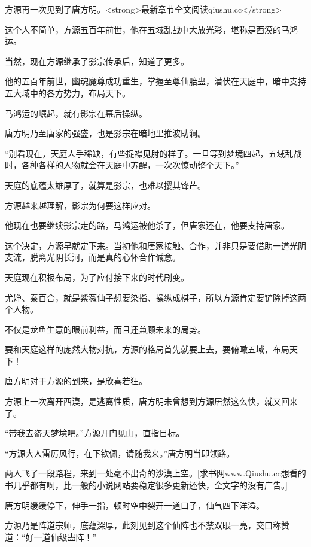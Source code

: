 
\begin{this_body}

方源再一次见到了唐方明。<strong>最新章节全文阅读qiushu.cc</strong>

这个人不简单，方源五百年前世，他在五域乱战中大放光彩，堪称是西漠的马鸿运。

当然，现在方源继承了影宗传承后，知道了更多。

他的五百年前世，幽魂魔尊成功重生，掌握至尊仙胎蛊，潜伏在天庭中，暗中支持五大域中的各方势力，布局天下。

马鸿运的崛起，就有影宗在幕后操纵。

唐方明乃至唐家的强盛，也是影宗在暗地里推波助澜。

“别看现在，天庭人手稀缺，有些捉襟见肘的样子。一旦等到梦境四起，五域乱战时，各种各样的人物就会在天庭中苏醒，一次次惊动整个天下。”

天庭的底蕴太雄厚了，就算是影宗，也难以撄其锋芒。

方源越来越理解，影宗为何要这样应对。

他现在也要继续影宗走的路，马鸿运被他杀了，但唐家还在，他要支持唐家。

这个决定，方源早就定下来。当初他和唐家接触、合作，并非只是要借助一道光阴支流，脱离光阴长河，而是真的心怀合作诚意。

天庭现在积极布局，为了应付接下来的时代剧变。

尤婵、秦百合，就是紫薇仙子想要染指、操纵成棋子，所以方源肯定要铲除掉这两个人物。

不仅是龙鱼生意的眼前利益，而且还兼顾未来的局势。

要和天庭这样的庞然大物对抗，方源的格局首先就要上去，要俯瞰五域，布局天下！

唐方明对于方源的到来，是欣喜若狂。

方源上一次离开西漠，是逃离性质，唐方明未曾想到方源居然这么快，就又回来了。

“带我去盗天梦境吧。”方源开门见山，直指目标。

“方源大人雷厉风行，在下钦佩，请随我来。”唐方明当即领路。

两人飞了一段路程，来到一处毫不出奇的沙漠上空。[求书网www.Qiushu.cc想看的书几乎都有啊，比一般的小说网站要稳定很多更新还快，全文字的没有广告。]

唐方明缓缓停下，伸手一指，顿时空中裂开一道口子，仙气四下洋溢。

方源乃是阵道宗师，底蕴深厚，此刻见到这个仙阵也不禁双眼一亮，交口称赞道：“好一道仙级蛊阵！”


\end{this_body}
